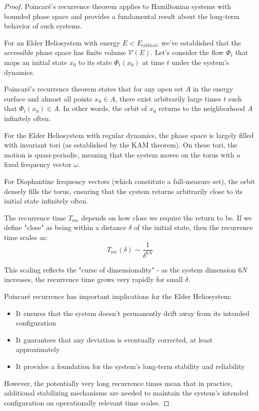 \begin{proof}
Poincaré's recurrence theorem applies to Hamiltonian systems with bounded phase space and provides a fundamental result about the long-term behavior of such systems.

For an Elder Heliosystem with energy $E < E_{\text{critical}}$, we've established that the accessible phase space has finite volume $\mathcal{V}(E)$. Let's consider the flow $\Phi_t$ that maps an initial state $x_0$ to its state $\Phi_t(x_0)$ at time $t$ under the system's dynamics.

Poincaré's recurrence theorem states that for any open set $A$ in the energy surface and almost all points $x_0 \in A$, there exist arbitrarily large times $t$ such that $\Phi_t(x_0) \in A$. In other words, the orbit of $x_0$ returns to the neighborhood $A$ infinitely often.

For the Elder Heliosystem with regular dynamics, the phase space is largely filled with invariant tori (as established by the KAM theorem). On these tori, the motion is quasi-periodic, meaning that the system moves on the torus with a fixed frequency vector $\omega$.

For Diophantine frequency vectors (which constitute a full-measure set), the orbit densely fills the torus, ensuring that the system returns arbitrarily close to its initial state infinitely often.

The recurrence time $T_{\text{rec}}$ depends on how close we require the return to be. If we define "close" as being within a distance $\delta$ of the initial state, then the recurrence time scales as:
\begin{equation}
T_{\text{rec}}(\delta) \sim \frac{1}{\delta^{6N}}
\end{equation}

This scaling reflects the "curse of dimensionality" - as the system dimension $6N$ increases, the recurrence time grows very rapidly for small $\delta$.

Poincaré recurrence has important implications for the Elder Heliosystem:
\begin{itemize}
    \item It ensures that the system doesn't permanently drift away from its intended configuration
    \item It guarantees that any deviation is eventually corrected, at least approximately
    \item It provides a foundation for the system's long-term stability and reliability
\end{itemize}

However, the potentially very long recurrence times mean that in practice, additional stabilizing mechanisms are needed to maintain the system's intended configuration on operationally relevant time scales.
\end{proof}

